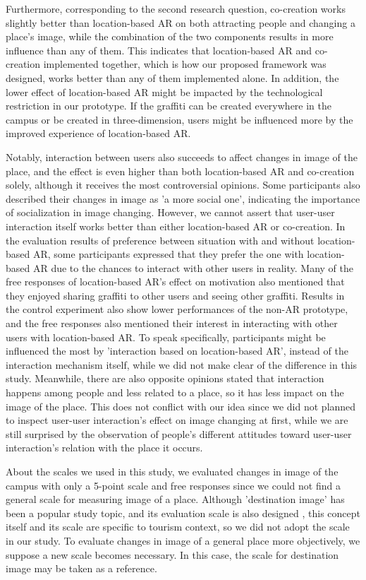 Furthermore, corresponding to the second research question, co-creation works slightly better than location-based AR on both attracting people and changing a place's image, while the combination of the two components results in more influence than any of them.
This indicates that location-based AR and co-creation implemented together, which is how our proposed framework was designed, works better than any of them implemented alone.
In addition, the lower effect of location-based AR might be impacted by the technological restriction in our prototype. If the graffiti can be created everywhere in the campus or be created in three-dimension, users might be influenced more by the improved experience of location-based AR.

Notably, interaction between users also succeeds to affect changes in image of the place, and the effect is even higher than both location-based AR and co-creation solely, although it receives the most controversial opinions.
Some participants also described their changes in image as 'a more social one', indicating the importance of socialization in image changing.
However, we cannot assert that user-user interaction itself works better than either location-based AR or co-creation.
In the evaluation results of preference between situation with and without location-based AR, some participants expressed that they prefer the one with location-based AR due to the chances to interact with other users in reality.
Many of the free responses of location-based AR's effect on motivation also mentioned that they enjoyed sharing graffiti to other users and seeing other graffiti. 
Results in the control experiment also show lower performances of the non-AR prototype, and the free responses also mentioned their interest in interacting with other users with location-based AR.
To speak specifically, participants might be influenced the most by 'interaction based on location-based AR', instead of the interaction mechanism itself, while we did not make clear of the difference in this study.
Meanwhile, there are also opposite opinions stated that interaction happens among people and less related to a place, so it has less impact on the image of the place.
This does not conflict with our idea since we did not planned to inspect user-user interaction's effect on image changing at first, while we are still surprised by the observation of people's different attitudes toward user-user interaction's relation with the place it occurs.

About the scales we used in this study, we evaluated changes in image of the campus with only a 5-point scale and free responses since we could not find a general scale for measuring image of a place.
Although 'destination image' has been a popular study topic, and its evaluation scale is also designed \cite{byon_zhang_2010}, this concept itself and its scale are specific to tourism context, so we did not adopt the scale in our study.
To evaluate changes in image of a general place more objectively, we suppose a new scale becomes necessary. In this case, the scale for destination image may be taken as a reference.

